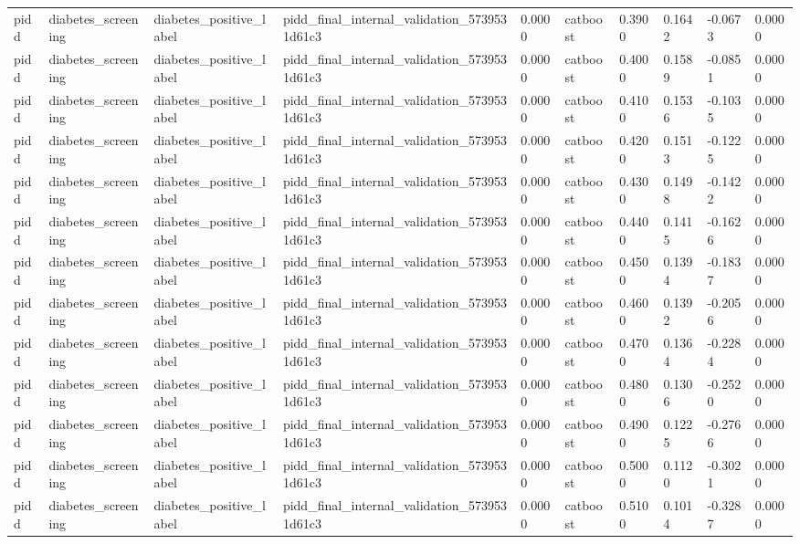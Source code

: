 \begin{tabular}{llllllllll}
pidd & diabetes\_screening & diabetes\_positive\_label & pidd\_final\_internal\_validation\_5739531d61c3 & 0.0000 & catboost & 0.3900 & 0.1642 & -0.0673 & 0.0000 \\
pidd & diabetes\_screening & diabetes\_positive\_label & pidd\_final\_internal\_validation\_5739531d61c3 & 0.0000 & catboost & 0.4000 & 0.1589 & -0.0851 & 0.0000 \\
pidd & diabetes\_screening & diabetes\_positive\_label & pidd\_final\_internal\_validation\_5739531d61c3 & 0.0000 & catboost & 0.4100 & 0.1536 & -0.1035 & 0.0000 \\
pidd & diabetes\_screening & diabetes\_positive\_label & pidd\_final\_internal\_validation\_5739531d61c3 & 0.0000 & catboost & 0.4200 & 0.1513 & -0.1225 & 0.0000 \\
pidd & diabetes\_screening & diabetes\_positive\_label & pidd\_final\_internal\_validation\_5739531d61c3 & 0.0000 & catboost & 0.4300 & 0.1498 & -0.1422 & 0.0000 \\
pidd & diabetes\_screening & diabetes\_positive\_label & pidd\_final\_internal\_validation\_5739531d61c3 & 0.0000 & catboost & 0.4400 & 0.1415 & -0.1626 & 0.0000 \\
pidd & diabetes\_screening & diabetes\_positive\_label & pidd\_final\_internal\_validation\_5739531d61c3 & 0.0000 & catboost & 0.4500 & 0.1394 & -0.1837 & 0.0000 \\
pidd & diabetes\_screening & diabetes\_positive\_label & pidd\_final\_internal\_validation\_5739531d61c3 & 0.0000 & catboost & 0.4600 & 0.1392 & -0.2056 & 0.0000 \\
pidd & diabetes\_screening & diabetes\_positive\_label & pidd\_final\_internal\_validation\_5739531d61c3 & 0.0000 & catboost & 0.4700 & 0.1364 & -0.2284 & 0.0000 \\
pidd & diabetes\_screening & diabetes\_positive\_label & pidd\_final\_internal\_validation\_5739531d61c3 & 0.0000 & catboost & 0.4800 & 0.1306 & -0.2520 & 0.0000 \\
pidd & diabetes\_screening & diabetes\_positive\_label & pidd\_final\_internal\_validation\_5739531d61c3 & 0.0000 & catboost & 0.4900 & 0.1225 & -0.2766 & 0.0000 \\
pidd & diabetes\_screening & diabetes\_positive\_label & pidd\_final\_internal\_validation\_5739531d61c3 & 0.0000 & catboost & 0.5000 & 0.1120 & -0.3021 & 0.0000 \\
pidd & diabetes\_screening & diabetes\_positive\_label & pidd\_final\_internal\_validation\_5739531d61c3 & 0.0000 & catboost & 0.5100 & 0.1014 & -0.3287 & 0.0000 \\

\end{tabular}
